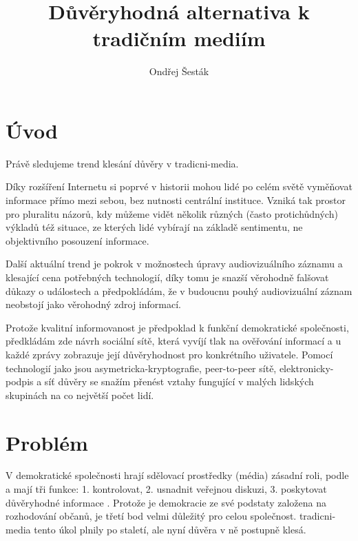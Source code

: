 \documentclass[12pt,a4paper]{report}
\begin{document}
\title{Důvěryhodná alternativa k tradičním mediím}
\author{Ondřej Šesták}

\tableofcontents

\chapter{Úvod}
\label{ch:uvod}

Právě sledujeme trend klesání důvěry v \gls{tradicni-media}.

Díky rozšíření Internetu si poprvé v historii mohou lidé po celém světě vyměňovat informace přímo mezi sebou, bez nutnosti centrální instituce. Vzniká tak prostor pro pluralitu názorů, kdy můžeme vidět několik různých (často protichůdných) výkladů též situace, ze kterých lidé vybírají na základě sentimentu, ne objektivního posouzení informace.

Další aktuální trend je pokrok v možnostech úpravy audiovizuálního záznamu a klesající cena potřebných technologií, díky tomu je snazší věrohodně falšovat důkazy o událostech a předpokládám, že v budoucnu pouhý audiovizuální záznam neobstojí jako věrohodný zdroj informací.

Protože kvalitní informovanost je předpoklad k funkční demokratické společnosti, předkládám zde návrh sociální sítě, která vyvíjí tlak na ověřování informací a u každé zprávy zobrazuje její důvěryhodnost pro konkrétního uživatele. Pomocí technologií jako jsou \gls{asymetricka-kryptografie}, \gls{peer-to-peer} sítě, \gls{elektronicky-podpis} a síť důvěry se snažím přenést vztahy fungující v malých lidských skupinách na co největší počet lidí.

\chapter{Problém}
\label{ch:problem}

V demokratické společnosti hrají sdělovací prostředky (média) zásadní roli, podle \citeauthor{netanel01}a mají tři funkce: 1. kontrolovat, 2. usnadnit veřejnou diskuzi, 3. poskytovat důvěryhodné informace \citep{netanel01}. Protože je demokracie ze své podstaty založena na rozhodování občanů, je třetí bod velmi důležitý pro celou společnost. \Gls{tradicni-media} tento úkol plnily po staletí, ale nyní důvěra v ně postupně klesá.
\end{document}
